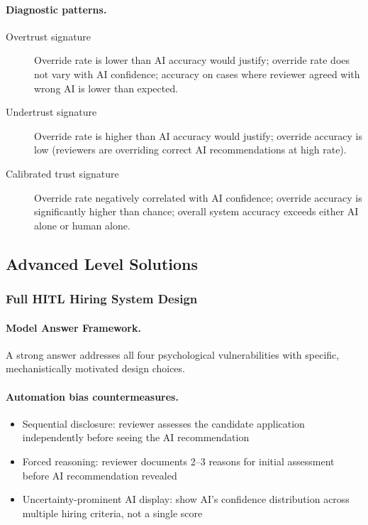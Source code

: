 \paragraph{Diagnostic patterns.}

\begin{description}
    \item[Overtrust signature] Override rate is lower than AI accuracy would justify; override rate does not vary with AI confidence; accuracy on cases where reviewer agreed with wrong AI is lower than expected.
    \item[Undertrust signature] Override rate is higher than AI accuracy would justify; override accuracy is low (reviewers are overriding correct AI recommendations at high rate).
    \item[Calibrated trust signature] Override rate negatively correlated with AI confidence; override accuracy is significantly higher than chance; overall system accuracy exceeds either AI alone or human alone.
\end{description}

\subsection{Advanced Level Solutions}

\subsubsection{Full HITL Hiring System Design}

\paragraph{Model Answer Framework.}

A strong answer addresses all four psychological vulnerabilities with specific, mechanistically motivated design choices.

\paragraph{Automation bias countermeasures.}
\begin{itemize}
    \item Sequential disclosure: reviewer assesses the candidate application independently before seeing the AI recommendation
    \item Forced reasoning: reviewer documents 2--3 reasons for initial assessment before AI recommendation revealed
    \item Uncertainty-prominent AI display: show AI's confidence distribution across multiple hiring criteria, not a single score
\end{itemize}

